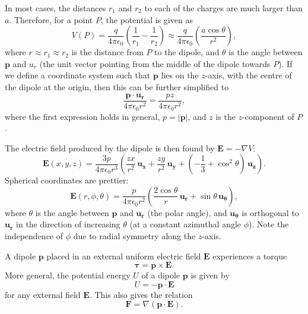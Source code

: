 \documentclass[a4paper, 12pt]{article}
\renewcommand{\vec}[1]{\mathbf{#1}}
\newcommand{\E}{\ensuremath{\vec{E}}}
\newcommand{\e}{\ensuremath{\epsilon_0}}
\begin{document}
    In most cases, the distances $r_1$ and $r_2$ to each of the charges are much larger than $a$. 
    Therefore, for a point $P$, the potential is given as 
    \begin{equation}
        V(P) = \frac{q}{4\pi\e}\left( \frac{1}{r_1}-\frac{1}{r_2}\right) \approx 
        \frac{q}{4\pi\e}\left(\frac{a\cos\theta}{r^2}\right),
    \end{equation}
    where $r \approx r_1 \approx r_2$ is the distance from $P$ to the dipole, and $\theta$ is the angle between $\vec{p}$ and $u_r$ 
    (the unit vector pointing from the middle of the dipole towards $P$). 
    If we define a coordinate system such that $\vec{p}$ lies on the $z$-axis, 
    with the centre of the dipole at the origin, then this can be further simplified to
    \begin{equation}
        \frac{\vec{p}\cdot \vec{u_r}}{4\pi\e r^2} = \frac{pz}{4\pi\e r^2},
    \end{equation}
    where the first expression holds in general, $p = |\vec{p}|$, and $z$ is the $z$-component of $P$.
    
    The electric field produced by the dipole is then found by $\E = -\nabla V$:
    \begin{equation}
        \E(x, y, z) = \frac{3p}{4\pi\e r^3}\left(\frac{zx}{r^2}\,\vec{u_x} + 
        \frac{zy}{r^2}\,\vec{u_y} + \left( -\frac{1}{3} +\cos^2\theta\right)\,\vec{u_z}\right).
    \end{equation}
    Spherical coordinates are prettier: 
    \begin{equation}
        \E(r, \phi, \theta) = \frac{p}{4\pi\e r^2}\left(\frac{2\cos\theta}{r}\,\vec{u_r} + \sin\theta \, \vec{u_\theta}\right),
    \end{equation}
    where $\theta$ is the angle between $\vec{p}$ and $\vec{u_r}$ (the polar angle), 
    and $\vec{u_\theta}$ is orthogonal to $\vec{u_r}$ in the direction of increasing $\theta$ (at a constant azimuthal angle $\phi$). 
    Note the independence of $\phi$ due to radial symmetry along the $z$-axis. 
    
    A dipole $\vec{p}$ placed in an external uniform electric field $\E$ experiences a torque
    \begin{equation}
        \vec{\tau} = \vec{p} \times \E.
    \end{equation}
    More general, the potential energy $U$ of a dipole $\vec{p}$ is given by
    \begin{equation}
        U = -\vec{p}\cdot \E
    \end{equation}
    for any external field $\E$. This also gives the relation 
    \begin{equation}
        \vec{F} = \nabla\left(\vec{p}\cdot\E\right).
    \end{equation}
\end{document}
